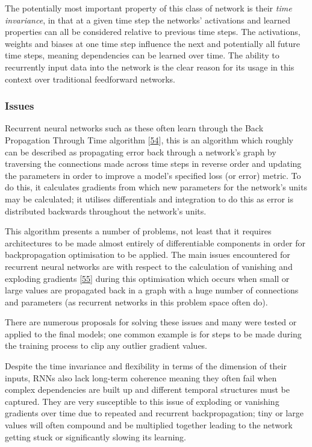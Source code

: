 \documentclass[12pt,]{article}
\begin{document}
The potentially most important property of this class of network is
their \emph{time invariance}, in that at a given time step the networks'
activations and learned properties can all be considered relative to
previous time steps. The activations, weights and biases at one time
step influence the next and potentially all future time steps, meaning
dependencies can be learned over time. The ability to recurrently input
data into the network is the clear reason for its usage in this context
over traditional feedforward networks.

\hypertarget{issues}{%
\subsubsection{Issues}\label{issues}}

Recurrent neural networks such as these often learn through the Back
Propagation Through Time algorithm
{[}\protect\hyperlink{ref-werbos1990backpropagation}{54}{]}, this is an
algorithm which roughly can be described as propagating error back
through a network's graph by traversing the connections made across time
steps in reverse order and updating the parameters in order to improve a
model's specified loss (or error) metric. To do this, it calculates
gradients from which new parameters for the network's units may be
calculated; it utilises differentials and integration to do this as
error is distributed backwards throughout the network's units.

This algorithm presents a number of problems, not least that it requires
architectures to be made almost entirely of differentiable components in
order for backpropagation optimisation to be applied. The main issues
encountered for recurrent neural networks are with respect to the
calculation of vanishing and exploding gradients
{[}\protect\hyperlink{ref-pascanu2012understanding}{55}{]} during this
optimisation which occurs when small or large values are propagated back
in a graph with a huge number of connections and parameters (as
recurrent networks in this problem space often do).

There are numerous proposals for solving these issues and many were
tested or applied to the final models; one common example is for steps
to be made during the training process to clip any outlier gradient
values.

Despite the time invariance and flexibility in terms of the dimension of
their inputs, RNNs also lack long-term coherence meaning they often fail
when complex dependencies are built up and different temporal structures
must be captured. They are very susceptible to this issue of exploding
or vanishing gradients over time due to repeated and recurrent
backpropagation; tiny or large values will often compound and be
multiplied together leading to the network getting stuck or
significantly slowing its learning.
\end{document}
